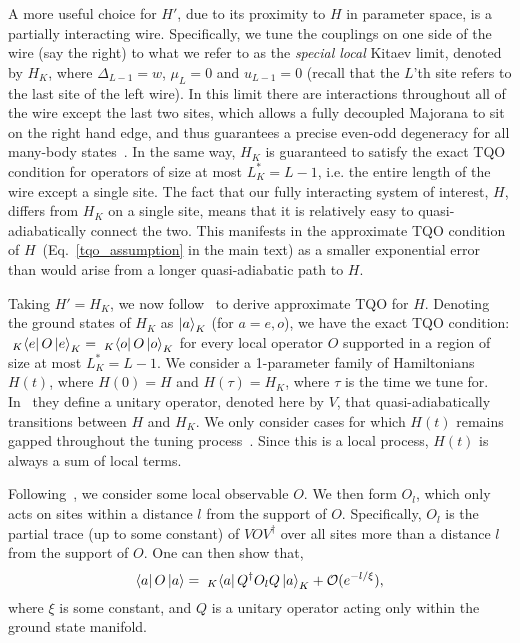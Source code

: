 \documentclass[aps,pra,floatfix,footinbib,longbibliography,twocolumn,superscriptaddress, preprintnumbers, nobibnotes]{revtex4-1}
\begin{document}
A more useful choice for $H'$, due to its proximity to $H$ in parameter space, is a partially interacting wire. Specifically, we tune the couplings on one side of the wire (say the right) to what we refer to as the \emph{special local} Kitaev limit, denoted by $H_K$, where $\Delta_{L-1} = w$, $\mu_L = 0$ and $u_{L-1} = 0$ (recall that the $L$'th site refers to the last site of the left wire). In this limit there are interactions throughout all of the wire except the last two sites, which allows a fully decoupled Majorana to sit on the right hand edge, and thus guarantees a precise even-odd degeneracy for all many-body states~\cite{Kells2015}. In the same way, $H_K$ is guaranteed to satisfy the exact TQO condition for operators of size at most $L_K^* = L -1 $, i.e. the entire length of the wire except a single site. The fact that our fully interacting system of interest, $H$, differs from $H_K$ on a single site, means that it is relatively easy to quasi-adiabatically connect the two. This manifests in the approximate TQO condition of $H$~(Eq.~\ref{tqo_assumption} in the main text) as a smaller exponential error than would arise from a longer quasi-adiabatic path to $H$.

Taking $H'=H_K$, we now follow~\cite{Hastings2005} to derive approximate TQO for $H$. Denoting the ground states of $H_K$ as $\left|a\right\rangle_K$ (for $a=e,o$), we have the exact TQO condition: $\phantom|_K \hspace{-0.5mm} \bra{e}O\ket{e}_K = \phantom|_K \hspace{-0.5mm} \bra{o}O\ket{o}_K$ for every local operator $O$ supported in a region of size at most $L_K^* = L-1$. We consider a 1-parameter family of Hamiltonians $H(t)$, where $H(0)=H$ and $H(\tau) = H_K$, where $\tau$ is the time we tune for. In~\cite{Hastings2005} they define a unitary operator, denoted here by $V$, that quasi-adiabatically transitions between $H$ and $H_K$. We only consider cases for which $H(t)$ remains gapped throughout the tuning process~\cite{Moon2018}. Since this is a local process, $H(t)$ is always a sum of local terms.

Following~\cite{Hastings2005}, we consider some local observable $O$. We then form $O_l$, which only acts on sites within a distance $l$ from the support of $O$. Specifically, $O_l$ is the partial trace (up to some constant) of $V O V^{\dagger}$ over all sites more than a distance $l$ from the support of $O$. One can then show that,
\begin{equation}
\bra{a}O\ket{a} = \phantom|_K \hspace{-0.5mm} \bra{a} Q^{\dagger} O_l Q \ket{a}_K + \mathcal{O} (e^{-l/\xi} ),
\end{equation}
where $\xi$ is some constant, and $Q$ is a unitary operator acting only within the ground state manifold. 
\end{document}
